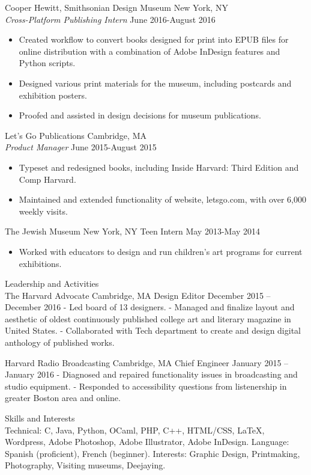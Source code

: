 \documentclass{article}
\begin{document}
{Cooper Hewitt, Smithsonian Design Museum \hfill New York, NY\\
\textit{Cross-Platform Publishing Intern} \hfill June 2016-August 2016
\begin{itemize}	\itemsep -2pt
	\item Created workflow to convert books designed for print into EPUB files for online distribution with a combination of Adobe InDesign features and Python scripts.
	\item Designed various print materials for the museum, including postcards and exhibition posters.
	\item Proofed and assisted in design decisions for museum publications. 
\end{itemize}

Let’s Go Publications \hfill Cambridge, MA\\
\textit{Product Manager} \hfill June 2015-August 2015	
\begin{itemize} \itemsep -2pt
	\item Typeset and redesigned books, including Inside Harvard: Third Edition and Comp Harvard.
	\item Maintained and extended functionality of website, letsgo.com, with over 6,000 weekly visits. 
\end{itemize}

The Jewish Museum \hfill New York, NY
Teen Intern \hfill May 2013-May 2014 
\begin{itemize} \itemsep -2pt
	\item Worked with educators to design and run children’s art programs for current exhibitions.
\end{itemize}

\textsf{\large Leadership and Activities}\\
The Harvard Advocate									Cambridge, MA
Design Editor						   	     December 2015 – December 2016
-	Led board of 13 designers.
-	Managed and finalize layout and aesthetic of oldest continuously published college art and literary magazine in United States.
-	Collaborated with Tech department to create and design digital anthology of published works. 

Harvard Radio Broadcasting								Cambridge, MA
Chief Engineer								January 2015 – January 2016
-	Diagnosed and repaired functionality issues in broadcasting and studio equipment.
-	Responded to accessibility questions from listenership in greater Boston area and online.

\textsf{\large Skills and Interests}\\
Technical: C, Java, Python, OCaml, PHP, C++, HTML/CSS, LaTeX, Wordpress, Adobe Photoshop, Adobe Illustrator, Adobe InDesign.
Language: Spanish (proficient), French (beginner).
Interests: Graphic Design, Printmaking, Photography, Visiting museums, Deejaying. 

}
\end{document}
